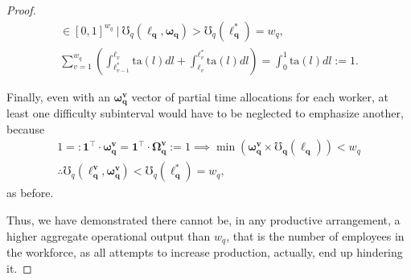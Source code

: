 \documentclass[hidelinks, nonatbib]{elsarticle}
\begin{document}
\begin{lemma}
\begin{proof}
\begin{gather}
            \in
            [0,1]^{w_q}
            \
            \big|
            \
            \mho_{q}(
                \boldsymbol{\ell_q}
                ,\boldsymbol{\omega_q}
            ) 
            >
            \mho_{q}(
                \boldsymbol{\ell_{q}^{*}}
            )
            =
            w_q
            ,
            \\
            \sum_{v=1}^{w_q}
            \left(
                \int_{
                    \ell_{v-1}^{*}
                }^{
                    \ell_{v}
                }
                \text{ta}(l)dl
                +
                \int_{
                    \ell_{v}
                }^{
                    \ell_{v}^{*}
                }
                \text{ta}(l)dl
            \right)
            =
            \int_{0}^{1}
            \text{ta}(l)dl
            :=
            1
            .
        \end{gather}
        
        Finally, even with an $\boldsymbol{\omega_{q}^{v}}$ vector of partial time allocations for each worker, at least one difficulty subinterval would have to be neglected to emphasize another, because
        \begin{gather}
            1 =:
            \boldsymbol{1} ^ \top
            \cdot
            \boldsymbol{\omega_{q}^{v}}
            =
            \boldsymbol{1} ^ \top
            \cdot
            \boldsymbol{\Omega_{q}^{v}}
            := 1
            \implies
            \min\left(
                \boldsymbol{\omega_{q}^{v}}
                \times
                \boldsymbol{\mho_q}(
                    \boldsymbol{\ell_{q}}
                )
            \right)
            <
            w_q
            \\
            \therefore
            \mho_q(
                \boldsymbol{\ell_{q}^{v}},
                \boldsymbol{\omega_{q}^{v}}
            )
            <
            \mho_q(
                \boldsymbol{\ell_{q}^{*}}
            )
            =
            w_q
            ,
        \end{gather}
        as before.
        
        Thus, we have demonstrated there cannot be, in any productive arrangement, a higher aggregate operational output than $w_q$, that is the number of employees in the workforce, as all attempts to increase production, actually, end up hindering it. 
        

\end{proof}
\end{lemma}
\end{document}

